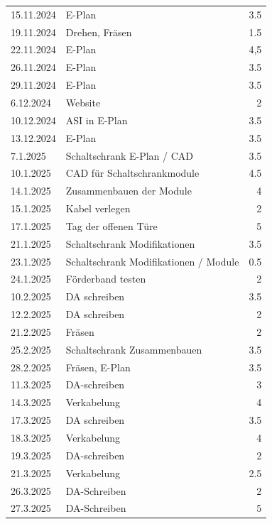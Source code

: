 \begin{longtable}{|l|p{10cm}|r|}
15.11.2024	&	E-Plan	&	3.5	\\
19.11.2024	&	Drehen, Fräsen	&	1.5	\\
22.11.2024	&	E-Plan	&	4,5	\\
26.11.2024	&	E-Plan	&	3.5	\\
29.11.2024	&	E-Plan	&	3.5	\\
6.12.2024	&	Website	&	2	\\
10.12.2024	&	ASI in E-Plan	&	3.5	\\
13.12.2024	&	E-Plan 	&	3.5	\\
7.1.2025	&	Schaltschrank E-Plan / CAD	&	3.5	\\
10.1.2025	&	CAD für Schaltschrankmodule	&	4.5	\\
14.1.2025	&	Zusammenbauen der Module	&	4	\\
15.1.2025	&	Kabel verlegen	&	2	\\
17.1.2025	&	Tag der offenen Türe	&	5	\\
21.1.2025	&	Schaltschrank Modifikationen	&	3.5	\\
23.1.2025	&	Schaltschrank Modifikationen / Module	&	0.5	\\
24.1.2025	&	 Förderband testen	&	2	\\
10.2.2025	&	DA schreiben	&	3.5	\\
12.2.2025	&	DA schreiben	&	2	\\
21.2.2025	&	Fräsen	&	2	\\
25.2.2025	&	Schaltschrank Zusammenbauen	&	3.5	\\
28.2.2025	&	Fräsen, E-Plan	&	3.5	\\
11.3.2025	&	DA-schreiben	&	3	\\
14.3.2025	&	Verkabelung	&	4	\\
17.3.2025	&	DA schreiben	&	3.5	\\
18.3.2025	&	Verkabelung	&	4	\\
19.3.2025	&	DA-schreiben 	&	2	\\
21.3.2025	&	Verkabelung	&	2.5	\\
26.3.2025	&	DA-Schreiben	&	2	\\
27.3.2025 &	DA-Schreiben	&	5	\\
\end{longtable}
\newpage


